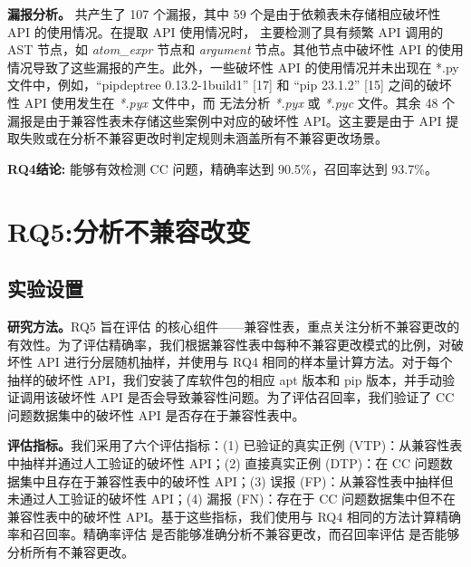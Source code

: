 \textbf{漏报分析。}\tool{} 共产生了 107 个漏报，其中 59 个是由于依赖表未存储相应破坏性 API 的使用情况。在提取 API 使用情况时，\tool{} 主要检测了具有频繁 API 调用的 AST 节点，如 \textit{atom\_expr} 节点和 \textit{argument} 节点。其他节点中破坏性 API 的使用情况导致了这些漏报的产生。此外，一些破坏性 API 的使用情况并未出现在 *.py 文件中，例如，“pipdeptree 0.13.2-1build1” [17] 和 “pip 23.1.2” [15] 之间的破坏性 API 使用发生在 \textit{*.pyx} 文件中，而 \tool{} 无法分析 \textit{*.pyx} 或 \textit{*.pyc} 文件。其余 48 个漏报是由于兼容性表未存储这些案例中对应的破坏性 API。这主要是由于 API 提取失败或在分析不兼容更改时判定规则未涵盖所有不兼容更改场景。

\begin{tcolorbox}[boxrule=1pt,boxsep=1pt,left=2pt,right=2pt,top=2pt,bottom=2pt]
	\small
	\textcolor{red}{} \noindent\textbf{RQ4结论:} 
	\tool{} 能够有效检测 CC 问题，精确率达到 90.5\%，召回率达到 93.7\%。
\end{tcolorbox} 

\section{RQ5:分析不兼容改变}
\subsection{实验设置}
\textbf{研究方法。}RQ5 旨在评估 \tool{} 的核心组件——兼容性表，重点关注分析不兼容更改的有效性。为了评估精确率，我们根据兼容性表中每种不兼容更改模式的比例，对破坏性 API 进行分层随机抽样，并使用与 RQ4 相同的样本量计算方法。对于每个抽样的破坏性 API，我们安装了库软件包的相应 apt 版本和 pip 版本，并手动验证调用该破坏性 API 是否会导致兼容性问题。为了评估召回率，我们验证了 CC 问题数据集中的破坏性 API 是否存在于兼容性表中。

\textbf{评估指标。}我们采用了六个评估指标：(1) 已验证的真实正例 (VTP)：从兼容性表中抽样并通过人工验证的破坏性 API；(2) 直接真实正例 (DTP)：在 CC 问题数据集中且存在于兼容性表中的破坏性 API；(3) 误报 (FP)：从兼容性表中抽样但未通过人工验证的破坏性 API；(4) 漏报 (FN)：存在于 CC 问题数据集中但不在兼容性表中的破坏性 API。基于这些指标，我们使用与 RQ4 相同的方法计算精确率和召回率。精确率评估 \tool{} 是否能够准确分析不兼容更改，而召回率评估 \tool{} 是否能够分析所有不兼容更改。
